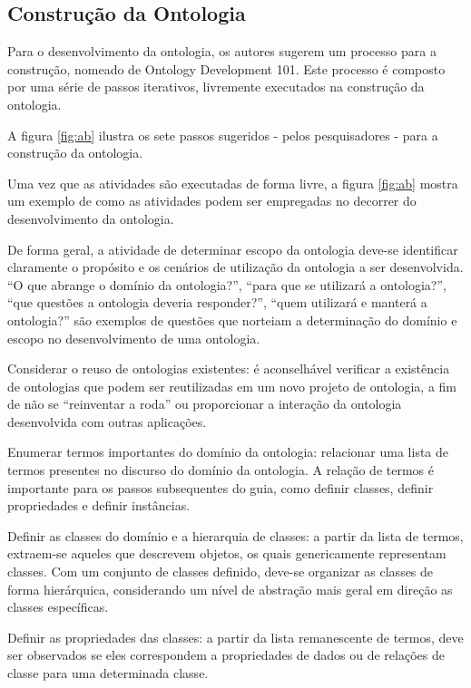 \subsection{Construção da Ontologia}

Para  o desenvolvimento da ontologia, os autores sugerem um processo para a construção, nomeado de Ontology Development 101. Este processo é composto por uma série de passos iterativos, livremente executados na construção da ontologia.\cite{MCGUINNESS}

A figura \ref{fig:ab} ilustra os sete passos sugeridos - pelos pesquisadores - para a construção da ontologia.

Uma vez que as atividades são executadas de forma livre, a figura \ref{fig:ab} mostra um exemplo de como as atividades podem ser empregadas no decorrer do desenvolvimento da ontologia.

De forma geral, a atividade de determinar escopo da ontologia deve-se identificar claramente o propósito e os cenários de utilização da ontologia a ser desenvolvida. “O que abrange o domínio da ontologia?”, “para que se utilizará a ontologia?”, “que questões a ontologia deveria responder?”, “quem utilizará e manterá a ontologia?” são exemplos de questões que norteiam a determinação do domínio e escopo no desenvolvimento de uma ontologia.

Considerar o reuso de ontologias existentes: é aconselhável verificar a existência de ontologias que podem ser reutilizadas em um novo projeto de ontologia, a fim de não se “reinventar a roda” ou proporcionar a interação da ontologia desenvolvida com outras aplicações.

Enumerar termos importantes do domínio da ontologia: relacionar uma lista de termos presentes no discurso do domínio da ontologia. A relação de termos é importante para os passos subsequentes do guia, como definir classes, definir propriedades e definir instâncias.

Definir as classes do domínio e a hierarquia de classes: a partir da lista de termos, extraem-se aqueles que descrevem objetos, os quais genericamente representam classes. Com um conjunto de classes definido, deve-se organizar as classes de forma hierárquica, considerando um nível de abstração mais geral em direção as classes específicas.

Definir as propriedades das classes: a partir da lista remanescente de termos, deve ser observados se eles correspondem a propriedades de dados ou de relações de classe para uma determinada classe.

